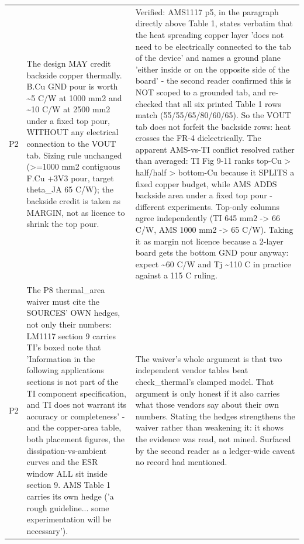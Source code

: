 \documentclass[11pt,a4paper]{article}
\begin{document}
{\begin{longtable}{lp{5.2cm}p{7.2cm}}
P2 & The design MAY credit backside copper thermally. B.Cu GND pour is worth \textasciitilde{}5 C/W at 1000 mm2 and \textasciitilde{}10 C/W at 2500 mm2 under a fixed top pour, WITHOUT any electrical connection to the VOUT tab. Sizing rule unchanged (\textgreater{}=1000 mm2 contiguous F.Cu +3V3 pour, target theta\_JA 65 C/W); the backside credit is taken as MARGIN, not as licence to shrink the top pour. & Verified: AMS1117 p5, in the paragraph directly above Table 1, states verbatim that the heat spreading copper layer 'does not need to be electrically connected to the tab of the device' and names a ground plane 'either inside or on the opposite side of the board' - the second reader confirmed this is NOT scoped to a grounded tab, and re-checked that all six printed Table 1 rows match (55/55/65/80/60/65). So the VOUT tab does not forfeit the backside rows: heat crosses the FR-4 dielectrically. The apparent AMS-vs-TI conflict resolved rather than averaged: TI Fig 9-11 ranks top-Cu \textgreater{} half/half \textgreater{} bottom-Cu because it SPLITS a fixed copper budget, while AMS ADDS backside area under a fixed top pour - different experiments. Top-only columns agree independently (TI 645 mm2 -\textgreater{} 66 C/W, AMS 1000 mm2 -\textgreater{} 65 C/W). Taking it as margin not licence because a 2-layer board gets the bottom GND pour anyway: expect \textasciitilde{}60 C/W and Tj \textasciitilde{}110 C in practice against a 115 C ruling. \\
P2 & The P8 thermal\_area waiver must cite the SOURCES' OWN hedges, not only their numbers: LM1117 section 9 carries TI's boxed note that 'Information in the following applications sections is not part of the TI component specification, and TI does not warrant its accuracy or completeness' - and the copper-area table, both placement figures, the dissipation-vs-ambient curves and the ESR window ALL sit inside section 9. AMS Table 1 carries its own hedge ('a rough guideline... some experimentation will be necessary'). & The waiver's whole argument is that two independent vendor tables beat check\_thermal's clamped model. That argument is only honest if it also carries what those vendors say about their own numbers. Stating the hedges strengthens the waiver rather than weakening it: it shows the evidence was read, not mined. Surfaced by the second reader as a ledger-wide caveat no record had mentioned. \\

\end{longtable}}
\end{document}
